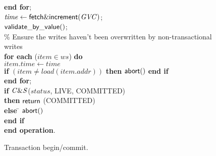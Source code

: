 \documentclass[11pt,letterpaper]{article}
\begin{document}
\begin{figure} [htb]
{{\begin{minipage}[t]{150mm}
\begin{tabbing}
 \> {\bf end for}; \\

 \> $\mathit{time} \gets {\sf fetch\&increment}(\mathit{GVC})$; \\

 \> ${\sf validate\_by\_value}()$;  \\


\> \% Ensure the writes haven't been overwritten by non-transactional writes \\
 \> 
{\bf for each} ($\mathit{item} \in \mathit{ws}$) {\bf do} \\
 \>\> $\mathit{item.time} \gets \mathit{time}$ \\
 \>\> {\bf if} $(\mathit{item} \neq load(\mathit{item.addr}))$  
                 {\bf then}  
                   ${\sf abort}()$ 
                {\bf end if} \\

 \> {\bf end for}; \\
 \> {\bf if} ${\sf \mathit{C\&S}}$($\mathit{status}$, LIVE, COMMITTED) \\
 \>\> {\bf then} \> ${\sf return}$ (COMMITTED)\\
 \> \> {\bf else} \= ${\sf abort}()$ \\
 \> {\bf end if}  \\
{\bf end operation}.

\end{tabbing}
\normalsize
\end{minipage}
}
\caption{Transaction begin/commit.}
\label{fig:tbc}
}
\end{figure}
\end{document}
